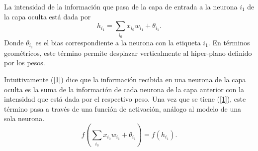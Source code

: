 \documentclass[11pt,letterpaper]{article}
\theoremstyle{definition}
\theoremstyle{definition}
\theoremstyle{definition}
\theoremstyle{definition}
\theoremstyle{definition}
\theoremstyle{definition}
\theoremstyle{definition}
\theoremstyle{definition}
\begin{document}
\noindent
La intensidad de la información que pasa de la capa de entrada a la neurona $ i_1 $ de la capa oculta está dada por
\begin{equation}\label{1}
	h_{i_1}=\displaystyle\sum_{i_0} x_{i_0} w_{i_1}+\theta_{i_1}.
\end{equation}
Donde $\theta_{i_1}$ es el bias correspondiente a la neurona con la etiqueta $ i_1 $. En términos geométricos, este término permite desplazar verticalmente al hiper-plano definido por los pesos.
\begin{center}
\end{center}

Intuitivamente (\ref{1}) dice que la información recibida en una neurona de la capa oculta es la suma de la información de cada neurona de la capa anterior con la intensidad que está dada por el respectivo peso. Una vez que se tiene (\ref{1}), este término pasa a través de una función de activación, análogo al modelo de una sola neurona.
\[f \left(\displaystyle\sum_{i_0} x_{i_0} w_{i_1}+\theta_{i_1}\right)=f(h_{i_1}).\]
\end{document}
